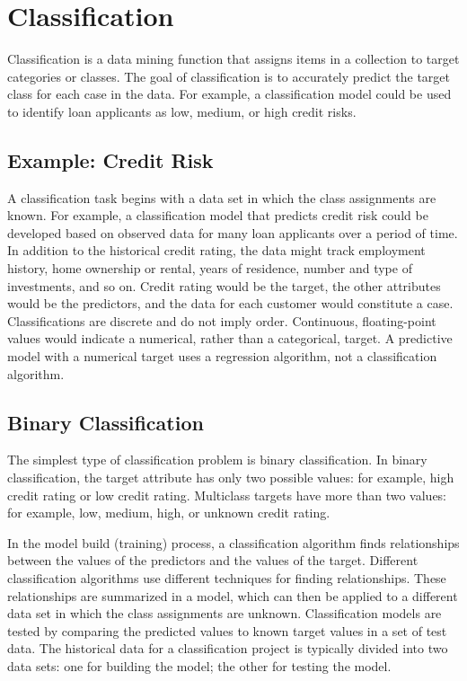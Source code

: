 \section{Classification}
Classification is a data mining function that assigns items in a collection to target categories or classes. The goal of classification is to accurately predict the target class for each case in the data. For example, a classification model could be used to identify loan applicants as low, medium, or high credit risks.

\subsection{Example: Credit Risk}
A classification task begins with a data set in which the class assignments are known. For example, a classification model that predicts credit risk could be developed based on observed data for many loan applicants over a period of time. In addition to the historical credit rating, the data might track employment history, home ownership or rental, years of residence, number and type of investments, and so on. Credit rating would be the target, the other attributes would be the predictors, and the data for each customer would constitute a case.
Classifications are discrete and do not imply order. Continuous, floating-point values would indicate a numerical, rather than a categorical, target. A predictive model with a numerical target uses a regression algorithm, not a classification algorithm.

\subsection{Binary Classification}
The simplest type of classification problem is binary classification. In binary classification, the target attribute has only two possible values: for example, high credit rating or low credit rating. Multiclass targets have more than two values: for example, low, medium, high, or unknown credit rating.

In the model build (training) process, a classification algorithm finds relationships between the values of the predictors and the values of the target. Different classification algorithms use different techniques for finding relationships. These relationships are summarized in a model, which can then be applied to a different data set in which the class assignments are unknown.
Classification models are tested by comparing the predicted values to known target values in a set of test data. The historical data for a classification project is typically divided into two data sets: one for building the model; the other for testing the model.

